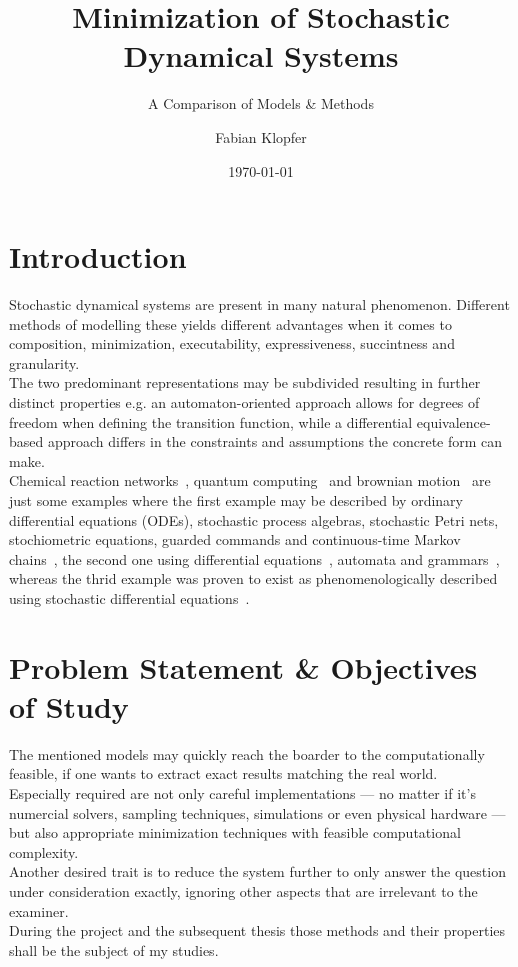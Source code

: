 \documentclass[11pt, rgb]{scrartcl}
\date{\today}
\author{Fabian Klopfer}
\title{Minimization of Stochastic Dynamical Systems}
\subtitle{A Comparison of Models \& Methods}
\begin{document}
\restoregeometry


\section{Introduction} Stochastic dynamical systems are present in many natural phenomenon. Different methods of modelling these yields different advantages when it comes to composition, minimization, executability, expressiveness, succintness and granularity. \\
The two predominant representations may be subdivided resulting in further distinct properties e.g. an automaton-oriented approach allows for degrees of freedom when defining the transition function, while a differential equivalence-based approach differs in the constraints and assumptions the concrete form can make. \\
 Chemical reaction networks~\autocite{mc_agg_crn}, quantum computing~\autocite{moore2000quantum} and brownian motion~\autocite{einstein1906theory} are just some examples where the first example may be described by ordinary differential equations (ODEs), stochastic process algebras, stochastic Petri nets, stochiometric equations, guarded commands and continuous-time Markov chains~\cite{wolf}, the second one using differential equations~\autocite{von2018mathematical}, automata and grammars~\autocite{moore2000quantum}, whereas the thrid example was proven to exist as phenomenologically described using stochastic differential equations~\autocite{einstein1906theory}. \\
 

\section{Problem Statement \& Objectives of Study}
The mentioned models may quickly reach the boarder to the computationally feasible, if one wants to extract exact results matching the real world. \\
Especially required are not only careful implementations --- no matter if it's numercial solvers, sampling techniques, simulations or even physical hardware --- but also appropriate minimization techniques with feasible computational complexity. \\
Another desired trait is to reduce the system further to only answer the question under consideration exactly, ignoring other aspects that are irrelevant to the examiner. \\
During the project and the subsequent thesis those methods and their properties shall be the subject of my studies. \\
\end{document}
